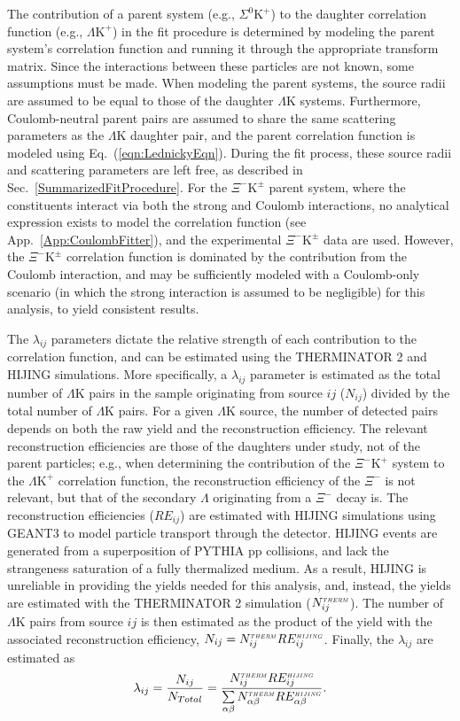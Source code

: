 \documentclass[ALICE,manyauthors]{cernphprep}
\newcommand{\Lam}{$\Lambda$\xspace}
\newcommand{\KchP}{$\mathrm{K^{+}}$\xspace}
\newcommand{\LamK}{$\Lambda$K\xspace}
\newcommand{\LamKchP}{$\Lambda\mathrm{K^{+}}$\xspace}
\newcommand{\XiKchP}{$\Xi^{-}\mathrm{K^{+}}$\xspace}
\newcommand{\XiKpm}{$\Xi^{-}\mathrm{K^{\pm}}$\xspace}
\begin{document}
The contribution of a parent system (e.g., $\Sigma^{0}$\KchP) to the daughter correlation function (e.g., \LamKchP) in the fit procedure is determined by modeling the parent system's correlation function and running it through the appropriate transform matrix.
Since the interactions between these particles are not known, some assumptions must be made.
When modeling the parent systems, the source radii are assumed to be equal to those of the daughter \LamK systems.
Furthermore, Coulomb-neutral parent pairs are assumed to share the same scattering parameters as the \LamK daughter pair, and the parent correlation function is modeled using Eq.~(\ref{eqn:LednickyEqn}).
During the fit process, these source radii and scattering parameters are left free, as described in Sec.~\ref{SummarizedFitProcedure}.
For the \XiKpm parent system, where the constituents interact via both the strong and Coulomb interactions, no analytical expression exists to model the correlation function (see App.~\ref{App:CoulombFitter}), and the experimental \XiKpm data are used.
However, the \XiKpm correlation function is dominated by the contribution from the Coulomb interaction, and may be sufficiently modeled with a Coulomb-only scenario (in which the strong interaction is assumed to be negligible) for this analysis, to yield consistent results.



The $\lambda_{ij}$ parameters dictate the relative strength of each contribution to the correlation function, and can be estimated using the THERMINATOR 2 and HIJING simulations.
More specifically, a $\lambda_{ij}$ parameter is estimated as the total number of \LamK pairs in the sample originating from source $ij$ ($N_{ij}$) divided by the total number of \LamK pairs.
For a given \LamK source, the number of detected pairs depends on both the raw yield and the reconstruction efficiency.
The relevant reconstruction efficiencies are those of the daughters under study, not of the parent particles; e.g., when determining the contribution of the \XiKchP system to the \LamKchP correlation function, the reconstruction efficiency of the $\Xi^{-}$ is not relevant, but that of the secondary \Lam originating from a $\Xi^{-}$ decay is. 
The reconstruction efficiencies ($RE_{ij}$) are estimated with HIJING simulations using GEANT3 to model particle transport through the detector.
HIJING events are generated from a superposition of PYTHIA pp collisions, and lack the strangeness saturation of a fully thermalized medium.
As a result, HIJING is unreliable in providing the yields needed for this analysis, and, instead, the yields are estimated with the THERMINATOR 2 simulation ($N_{ij}^{\scaleto{THERM}{3pt}}$).
The number of \LamK pairs from source $ij$ is then estimated as the product of the yield with the associated reconstruction efficiency, $N_{ij} = N_{ij}^{\scaleto{THERM}{3pt}}RE_{ij}^{\scaleto{HIJING}{3pt}}$.
Finally, the $\lambda_{ij}$ are estimated as
\begin{equation}
\lambda_{ij} = \frac{N_{ij}}{N_{Total}} = \frac{N_{ij}^{\scaleto{THERM}{3pt}}RE_{ij}^{\scaleto{HIJING}{3pt}}}{\sum\limits_{\alpha\beta} N_{\alpha\beta}^{\scaleto{THERM}{3pt}}RE_{\alpha\beta}^{\scaleto{HIJING}{3pt}}}.
\end{equation}
\end{document}
